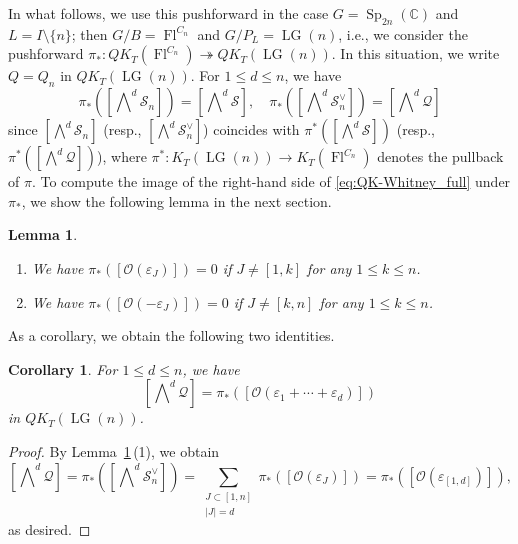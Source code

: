 \documentclass[a4paper, 11pt, reqno]{amsart}
\numberwithin{equation}{section}
\newcommand{\BC}{\mathbb{C}}
\newcommand{\CO}{\mathcal{O}}
\newcommand{\CQ}{\mathcal{Q}}
\newcommand{\CS}{\mathcal{S}}
\newcommand{\ve}{\varepsilon}
\newcommand{\Sp}[1]{\operatorname{Sp}_{#1}(\BC)}
\newcommand{\LG}{\operatorname{LG}}
\newcommand{\FlC}[1]{\operatorname{Fl}^{C_{#1}}}
\newcommand{\class}[1]{\left[ #1 \right]}
\newcommand{\extprod}{\bigwedge\nolimits}
\theoremstyle{plain}
\newtheorem{lem}[thm]{Lemma}
\newtheorem{cor}[thm]{Corollary}
\theoremstyle{definition}
\theoremstyle{remark}
\newenvironment{enu}{%
\begin{enumerate}[label=\textup{(\arabic*)}, left=0pt]}{%
\end{enumerate}}
\begin{document}
In what follows, we use this pushforward in the case $G = \Sp{2n}$ and $L = I \setminus \{n\}$; then $G/B = \FlC{n}$ and $G/P_{L} = \LG(n)$, i.e., we consider the pushforward $\pi_{\ast}: QK_{T}(\FlC{n}) \twoheadrightarrow QK_{T}(\LG(n))$. 
In this situation, we write $Q = Q_{n}$ in $QK_{T}(\LG(n))$. 
For $1 \le d \le n$, we have 
\begin{equation}
\pi_{\ast}\left( \class{\extprod^{d} \CS_{n}} \right) = \class{\extprod^{d} \CS}, \quad \pi_{\ast}\left( \class{\extprod^{d} \CS_{n}^{\vee}} \right) = \class{\extprod^{d} \CQ} 
\end{equation}
since $\class{\extprod^{d} \CS_{n}}$ (resp., $\class{\extprod^{d} \CS_{n}^{\vee}}$) coincides with $\pi^{\ast} \left(\class{\extprod^{d} \CS}\right)$ (resp., $\pi^{\ast} \left(\class{\extprod^{d} \CQ} \right)$), where $\pi^{\ast}: K_{T}(\LG(n)) \rightarrow K_{T}(\FlC{n})$ denotes the pullback of $\pi$. 
To compute the image of the right-hand side of \eqref{eq:QK-Whitney_full} under $\pi_{\ast}$, we show the following lemma in the next section. 
\begin{lem} \label{lem:line_proj}
\begin{enu}
\item We have $\pi_{\ast}([\CO(\ve_{J})]) = 0$ if $J \not= [1, k]$ for any $1 \le k \le n$. 

\item We have $\pi_{\ast}([\CO(-\ve_{J})]) = 0$ if $J \not= [k, n]$ for any $1 \le k \le n$.
\end{enu}
\end{lem}

As a corollary, we obtain the following two identities. 
\begin{cor} \label{cor:quotient}
For $1 \le d \le n$, we have 
\begin{equation}
\class{\extprod^{d} \CQ} = \pi_{\ast}(\class{\CO(\ve_{1} + \cdots + \ve_{d})}) 
\end{equation}
in $QK_{T}(\LG(n))$. 
\end{cor}
\begin{proof}
By Lemma~\ref{lem:line_proj}\,(1), we obtain 
\begin{equation}
\class{\extprod^{d} \CQ} = \pi_{\ast} \left( \class{\extprod^{d} \CS_{n}^{\vee}} \right) = \sum_{\substack{J \subset [1, n] \\ |J|=d}} \pi_{\ast}(\class{\CO(\ve_{J})}) = \pi_{\ast}\left( \class{\CO(\ve_{[1, d]})} \right),  
\end{equation}
as desired. 
\end{proof}
\end{document}
